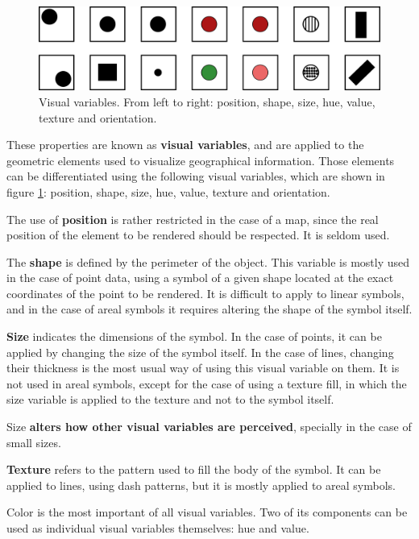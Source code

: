 \begin{figure}[!hbt]
\centering
\includegraphics[width=\columnwidth]{Visualization/VisualVariables.pdf}
\caption{\small Visual variables. From left to right: position, shape, size, hue, value, texture and orientation.}
\label{Fig:VisualVariables} 
\end{figure}

These properties are known as \textbf{visual variables}, and are applied to the geometric elements used to visualize geographical information. Those elements can be differentiated using the following visual variables, which are shown in figure \ref{Fig:VisualVariables}: position, shape, size, hue, value, texture and orientation.

The use of \textbf{position} is rather restricted in the case of a map, since the real position of the element to be rendered should be respected. It is seldom used. 

The \textbf{shape} is defined by the perimeter of the object. This variable is mostly used in the case of point data, using a symbol of a given shape located at the exact coordinates of the point to be rendered. It is difficult to apply to linear symbols, and in the case of areal symbols it requires altering the shape of the symbol itself.

\textbf{Size} indicates the dimensions of the symbol. In the case of points, it can be applied by changing the size of the symbol itself. In the case of lines, changing their thickness is the most usual way of using this visual variable on them. It is not used in areal symbols, except for the case of using a texture fill, in which the size variable is applied to the texture and not to the symbol itself.

Size \textbf{alters how other visual variables are perceived}, specially in the case of small sizes.

\textbf{Texture} refers to the pattern used to fill the body of the symbol. It can be applied to lines, using dash patterns, but it is mostly applied to areal symbols.

Color is the most important of all visual variables. Two of its components can be used as individual visual variables themselves: hue and value.

